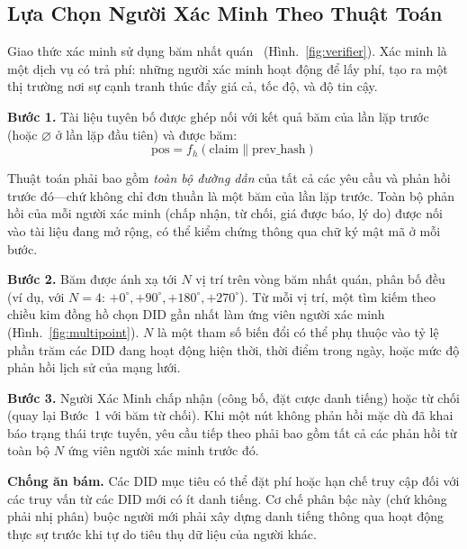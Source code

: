 \documentclass[11pt,a4paper,twocolumn]{article}
\begin{document}
\subsection{Lựa Chọn Người Xác Minh Theo Thuật Toán}

Giao thức xác minh sử dụng băm nhất quán~\cite{karger1997} (Hình.~\ref{fig:verifier}). Xác minh là một dịch vụ có trả phí: những người xác minh hoạt động để lấy phí, tạo ra một thị trường nơi sự cạnh tranh thúc đẩy giá cả, tốc độ, và độ tin cậy.

\textbf{Bước 1.} Tài liệu tuyên bố được ghép nối với kết quả băm của lần lặp trước (hoặc $\varnothing$ ở lần lặp đầu tiên) và được băm:
\begin{equation}
\text{pos} = f_h(\text{claim} \| \text{prev\_hash})
\label{eq:hash}
\end{equation}

Thuật toán phải bao gồm \emph{toàn bộ đường dẫn} của tất cả các yêu cầu và phản hồi trước đó---chứ không chỉ đơn thuần là một băm của lần lặp trước. Toàn bộ phản hồi của mỗi người xác minh (chấp nhận, từ chối, giá được báo, lý do) được nối vào tài liệu đang mở rộng, có thể kiểm chứng thông qua chữ ký mật mã ở mỗi bước.

\textbf{Bước 2.} Băm được ánh xạ tới $N$ vị trí trên vòng băm nhất quán, phân bố đều (ví dụ, với $N=4$: $+0^{\circ}, +90^{\circ}, +180^{\circ}, +270^{\circ}$). Từ mỗi vị trí, một tìm kiếm theo chiều kim đồng hồ chọn DID gần nhất làm ứng viên người xác minh (Hình.~\ref{fig:multipoint}). $N$ là một tham số biến đổi có thể phụ thuộc vào tỷ lệ phần trăm các DID đang hoạt động hiện thời, thời điểm trong ngày, hoặc mức độ phản hồi lịch sử của mạng lưới.

\textbf{Bước 3.} Người Xác Minh chấp nhận (công bố, đặt cược danh tiếng) hoặc từ chối (quay lại Bước~1 với băm từ chối). Khi một nút không phản hồi mặc dù đã khai báo trạng thái trực tuyến, yêu cầu tiếp theo phải bao gồm tất cả các phản hồi từ toàn bộ $N$ ứng viên người xác minh trước đó.

\textbf{Chống ăn bám.} Các DID mục tiêu có thể đặt phí hoặc hạn chế truy cập đối với các truy vấn từ các DID mới có ít danh tiếng. Cơ chế phân bậc này (chứ không phải nhị phân) buộc người mới phải xây dựng danh tiếng thông qua hoạt động thực sự trước khi tự do tiêu thụ dữ liệu của người khác.
\end{document}
